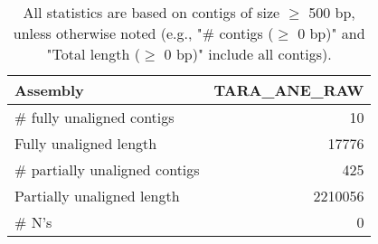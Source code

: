 \documentclass[12pt,a4paper]{article}
\begin{document}
\begin{table}[ht]
\begin{center}
\caption{All statistics are based on contigs of size $\geq$ 500 bp, unless otherwise noted (e.g., "\# contigs ($\geq$ 0 bp)" and "Total length ($\geq$ 0 bp)" include all contigs).}
\begin{tabular}{|l*{1}{|r}|}
\hline
Assembly & TARA\_ANE\_RAW \\ \hline
\# fully unaligned contigs & 10 \\ \hline
Fully unaligned length & 17776 \\ \hline
\# partially unaligned contigs & 425 \\ \hline
Partially unaligned length & 2210056 \\ \hline
\# N's & 0 \\ \hline
\end{tabular}
\end{center}
\end{table}
\end{document}
